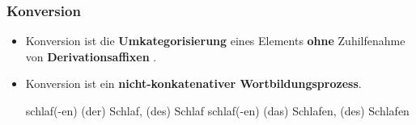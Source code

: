 
\begin{frame}
\frametitle{Konversion}

\begin{itemize}
\item Konversion ist die \textbf{Umkategorisierung} eines Elements \textbf{ohne} Zuhilfenahme von \textbf{Derivationsaffixen} .

\item Konversion ist ein \textbf{nicht-konkatenativer Wortbildungsprozess}.

\eal 
\ex {}schlaf(-en) \ras (der) Schlaf, (des) Schlaf
\ex {}schlaf(-en) \ras (das) Schlafen, (des) Schlafen
\zl

\end{itemize}

\end{frame}


